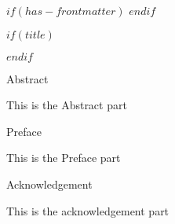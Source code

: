 $if(has-frontmatter)$
\frontmatter
$endif$

$if(title)$
\maketitle
$endif$

\newpage


\begin{center}
\Large{Abstract}
\end{center}

\vspace*{\baselineskip}

This is the Abstract part

\newpage


\begin{center}
\Large{Preface}
\end{center}

\vspace*{\baselineskip}

This is the Preface part

\newpage


\begin{center}
\Large{Acknowledgement}
\end{center}

\vspace*{\baselineskip}

This is the acknowledgement part

\newpage